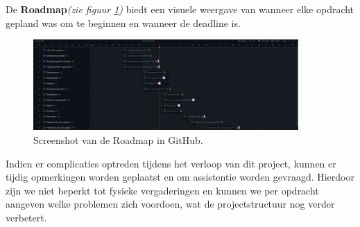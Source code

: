 De \textbf{Roadmap}\textit{(zie figuur \ref{fig:roadmap})} biedt een visuele weergave van wanneer elke opdracht gepland was om te beginnen en wanneer de deadline is.

\begin{figure}[h]
\centering
\includegraphics[width=0.9\textwidth]{IMG/roadmap.PNG}
\caption{Screenshot van de Roadmap in GitHub.}
\label{fig:roadmap}
\end{figure}

Indien er complicaties optreden tijdens het verloop van dit project, kunnen er tijdig opmerkingen worden geplaatst en om assistentie worden gevraagd. Hierdoor zijn we niet beperkt tot fysieke vergaderingen en kunnen we per opdracht aangeven welke problemen zich voordoen, wat de projectstructuur nog verder verbetert.





